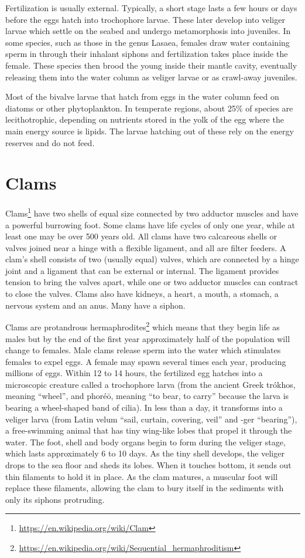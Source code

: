 \documentclass[]{book}
\let\rmarkdownfootnote\footnote%
\def\footnote{\protect\rmarkdownfootnote}
\renewcommand{\href}[2]{#2\footnote{\url{#1}}}
\begin{document}
Fertilization is usually external. Typically, a short stage lasts a few hours or days before the eggs hatch into trochophore larvae. These later develop into veliger larvae which settle on the seabed and undergo metamorphosis into juveniles. In some species, such as those in the genus Lasaea, females draw water containing sperm in through their inhalant siphons and fertilization takes place inside the female. These species then brood the young inside their mantle cavity, eventually releasing them into the water column as veliger larvae or as crawl-away juveniles.

Most of the bivalve larvae that hatch from eggs in the water column feed on diatoms or other phytoplankton. In temperate regions, about 25\% of species are lecithotrophic, depending on nutrients stored in the yolk of the egg where the main energy source is lipids. The larvae hatching out of these rely on the energy reserves and do not feed.

\hypertarget{clams}{%
\section{Clams}\label{clams}}

\href{https://en.wikipedia.org/wiki/Clam}{Clams} have two shells of equal size connected by two adductor muscles and have a powerful burrowing foot. Some clams have life cycles of only one year, while at least one may be over 500 years old. All clams have two calcareous shells or valves joined near a hinge with a flexible ligament, and all are filter feeders. A clam's shell consists of two (usually equal) valves, which are connected by a hinge joint and a ligament that can be external or internal. The ligament provides tension to bring the valves apart, while one or two adductor muscles can contract to close the valves. Clams also have kidneys, a heart, a mouth, a stomach, a nervous system and an anus. Many have a siphon.

Clams are \href{https://en.wikipedia.org/wiki/Sequential_hermaphroditism}{protandrous hermaphrodites} which means that they begin life as males but by the end of the first year approximately half of the population will change to females. Male clams release sperm into the water which stimulates females to expel eggs. A female may spawn several times each year, producing millions of eggs.
Within 12 to 14 hours, the fertilized egg hatches into a microscopic creature called a trochophore larva (from the ancient Greek trókhos, meaning ``wheel'', and phoréō, meaning ``to bear, to carry'' because the larva is bearing a wheel-shaped band of cilia). In less than a day, it transforms into a veliger larva (from Latin velum ``sail, curtain, covering, veil'' and -ger ``bearing''), a free-swimming animal that has tiny wing-like lobes that propel it through the water. The foot, shell and body organs begin to form during the veliger stage, which lasts approximately 6 to 10 days. As the tiny shell develops, the veliger drops to the sea floor and sheds its lobes. When it touches bottom, it sends out thin filaments to hold it in place. As the clam matures, a muscular foot will replace these filaments, allowing the clam to bury itself in the sediments with only its siphons protruding.
\end{document}
